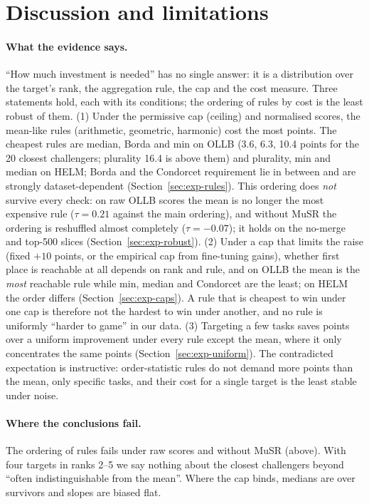 \section{Discussion and limitations}
\label{sec:discussion}

\paragraph{What the evidence says.}
``How much investment is needed'' has no single answer: it is a distribution over the target's rank, the aggregation rule, the cap and the cost measure.
Three statements hold, each with its conditions; the ordering of rules by cost is the least robust of them.
(1) Under the permissive cap (ceiling) and normalised scores, the mean-like rules (arithmetic, geometric, harmonic) cost the most points. The cheapest rules are median, Borda and min on OLLB (3.6, 6.3, 10.4 points for the 20 closest challengers; plurality 16.4 is above them) and plurality, min and median on HELM; Borda and the Condorcet requirement lie in between and are strongly dataset-dependent (Section~\ref{sec:exp-rules}). This ordering does \emph{not} survive every check: on raw OLLB scores the mean is no longer the most expensive rule ($\tau=0.21$ against the main ordering), and without MuSR the ordering is reshuffled almost completely ($\tau=-0.07$); it holds on the no-merge and top-500 slices (Section~\ref{sec:exp-robust}).
(2) Under a cap that limits the raise (fixed $+10$ points, or the empirical cap from fine-tuning gains), whether first place is reachable at all depends on rank and rule, and on OLLB the mean is the \emph{most} reachable rule while min, median and Condorcet are the least; on HELM the order differs (Section~\ref{sec:exp-caps}). A rule that is cheapest to win under one cap is therefore not the hardest to win under another, and no rule is uniformly ``harder to game'' in our data.
(3) Targeting a few tasks saves points over a uniform improvement under every rule except the mean, where it only concentrates the same points (Section~\ref{sec:exp-uniform}).
The contradicted expectation is instructive: order-statistic rules do not demand more points than the mean, only specific tasks, and their cost for a single target is the least stable under noise.

\paragraph{Where the conclusions fail.}
The ordering of rules fails under raw scores and without MuSR (above). With four targets in ranks 2--5 we say nothing about the closest challengers beyond ``often indistinguishable from the mean''. Where the cap binds, medians are over survivors and slopes are biased flat.

